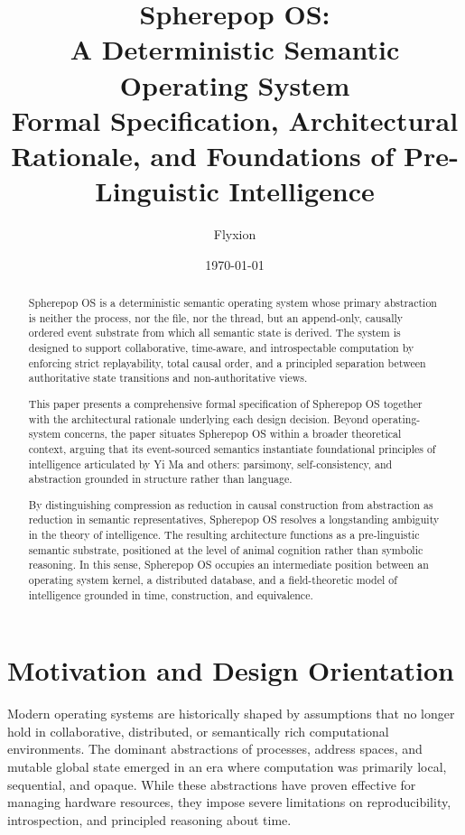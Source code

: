 \documentclass[11pt]{article}
\title{Spherepop OS:\\
A Deterministic Semantic Operating System\\
\large Formal Specification, Architectural Rationale, and Foundations of Pre-Linguistic Intelligence}
\author{Flyxion}
\date{\today}
\begin{document}
\maketitle

\begin{abstract}

Spherepop OS is a deterministic semantic operating system whose primary
abstraction is neither the process, nor the file, nor the thread, but an
append-only, causally ordered event substrate from which all semantic state
is derived. The system is designed to support collaborative, time-aware,
and introspectable computation by enforcing strict replayability, total
causal order, and a principled separation between authoritative state
transitions and non-authoritative views.

This paper presents a comprehensive formal specification of Spherepop OS
together with the architectural rationale underlying each design decision.
Beyond operating-system concerns, the paper situates Spherepop OS within a
broader theoretical context, arguing that its event-sourced semantics
instantiate foundational principles of intelligence articulated by Yi Ma
and others: parsimony, self-consistency, and abstraction grounded in
structure rather than language.

By distinguishing compression as reduction in causal construction from
abstraction as reduction in semantic representatives, Spherepop OS resolves
a longstanding ambiguity in the theory of intelligence. The resulting
architecture functions as a pre-linguistic semantic substrate, positioned
at the level of animal cognition rather than symbolic reasoning. In this
sense, Spherepop OS occupies an intermediate position between an operating
system kernel, a distributed database, and a field-theoretic model of
intelligence grounded in time, construction, and equivalence.
\end{abstract}

\section{Motivation and Design Orientation}

Modern operating systems are historically shaped by assumptions that no
longer hold in collaborative, distributed, or semantically rich
computational environments. The dominant abstractions of processes,
address spaces, and mutable global state emerged in an era where computation
was primarily local, sequential, and opaque. While these abstractions have
proven effective for managing hardware resources, they impose severe
limitations on reproducibility, introspection, and principled reasoning
about time.
\end{document}
